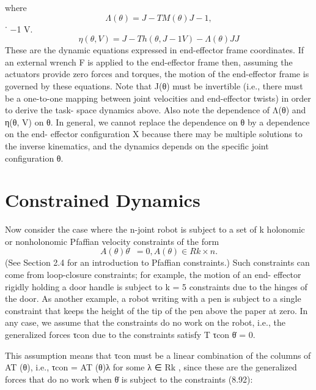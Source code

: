 \documentclass[12pt,a4paper]{article}
\begin{document}
where
\begin{equation}
Λ(θ) = J −T M (θ)J −1 ,
\label{eq:8.90}
\end{equation}
                                                          ˙ −1 V.
\begin{equation}
η(θ, V) = J −T h(θ, J −1 V) − Λ(θ)JJ
\label{eq:8.91}
\end{equation}
These are the dynamic equations expressed in end-effector frame coordinates.
If an external wrench F is applied to the end-effector frame then, assuming the
actuators provide zero forces and torques, the motion of the end-effector frame
is governed by these equations.
    Note that J(θ) must be invertible (i.e., there must be a one-to-one mapping
between joint velocities and end-effector twists) in order to derive the task-
space dynamics above. Also note the dependence of Λ(θ) and η(θ, V) on θ. In
general, we cannot replace the dependence on θ by a dependence on the end-
effector configuration X because there may be multiple solutions to the inverse
kinematics, and the dynamics depends on the specific joint configuration θ.

\section{Constrained Dynamics}
Now consider the case where the n-joint robot is subject to a set of k holonomic
or nonholonomic Pfaffian velocity constraints of the form
\begin{equation}
A(θ)θ̇ = 0,         A(θ) ∈ Rk×n .
\label{eq:8.92}
\end{equation}
(See Section 2.4 for an introduction to Pfaffian constraints.) Such constraints
can come from loop-closure constraints; for example, the motion of an end-
effector rigidly holding a door handle is subject to k = 5 constraints due to the
hinges of the door. As another example, a robot writing with a pen is subject
to a single constraint that keeps the height of the tip of the pen above the paper
at zero. In any case, we assume that the constraints do no work on the robot,
i.e., the generalized forces τcon due to the constraints satisfy
                                              T
                                             τcon θ̇ = 0.

This assumption means that τcon must be a linear combination of the columns
of AT (θ), i.e., τcon = AT (θ)λ for some λ ∈ Rk , since these are the generalized
forces that do no work when θ̇ is subject to the constraints (8.92):
\end{document}
